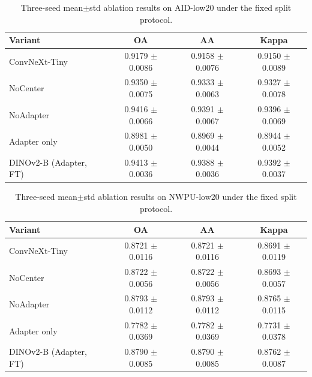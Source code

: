\begin{table}[t]
  \centering
  \caption{Three-seed mean$\pm$std ablation results on AID-low20 under the fixed split protocol.}
  \label{tab:aid-low20_ablation}
  \begin{tabular}{l c c c}
    \toprule
    Variant & OA & AA & Kappa \\
    \midrule
    ConvNeXt-Tiny & 0.9179 $\pm$ 0.0086 & 0.9158 $\pm$ 0.0076 & 0.9150 $\pm$ 0.0089 \\
    NoCenter & 0.9350 $\pm$ 0.0075 & 0.9333 $\pm$ 0.0063 & 0.9327 $\pm$ 0.0078 \\
    NoAdapter & 0.9416 $\pm$ 0.0066 & 0.9391 $\pm$ 0.0067 & 0.9396 $\pm$ 0.0069 \\
    Adapter only & 0.8981 $\pm$ 0.0050 & 0.8969 $\pm$ 0.0044 & 0.8944 $\pm$ 0.0052 \\
    DINOv2-B (Adapter, FT) & 0.9413 $\pm$ 0.0036 & 0.9388 $\pm$ 0.0036 & 0.9392 $\pm$ 0.0037 \\
    \bottomrule
  \end{tabular}
\end{table}

\begin{table}[t]
  \centering
  \caption{Three-seed mean$\pm$std ablation results on NWPU-low20 under the fixed split protocol.}
  \label{tab:nwpu-low20_ablation}
  \begin{tabular}{l c c c}
    \toprule
    Variant & OA & AA & Kappa \\
    \midrule
    ConvNeXt-Tiny & 0.8721 $\pm$ 0.0116 & 0.8721 $\pm$ 0.0116 & 0.8691 $\pm$ 0.0119 \\
    NoCenter & 0.8722 $\pm$ 0.0056 & 0.8722 $\pm$ 0.0056 & 0.8693 $\pm$ 0.0057 \\
    NoAdapter & 0.8793 $\pm$ 0.0112 & 0.8793 $\pm$ 0.0112 & 0.8765 $\pm$ 0.0115 \\
    Adapter only & 0.7782 $\pm$ 0.0369 & 0.7782 $\pm$ 0.0369 & 0.7731 $\pm$ 0.0378 \\
    DINOv2-B (Adapter, FT) & 0.8790 $\pm$ 0.0085 & 0.8790 $\pm$ 0.0085 & 0.8762 $\pm$ 0.0087 \\
    \bottomrule
  \end{tabular}
\end{table}
